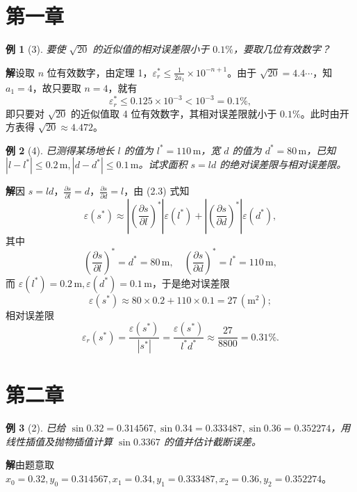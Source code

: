 \documentclass[a4paper,12pt]{ctexart}
\theoremstyle{exampleStyle}
\newtheorem*{example}{例}
\newcommand{\solution}{\par\noindent\textbf{解}\quad}
\begin{document}
\section*{第一章}

\begin{example}[3]
要使 $\sqrt{20}$ 的近似值的相对误差限小于 $0.1\%$，要取几位有效数字？
\end{example}

\solution 设取 $n$ 位有效数字，由定理 1，$\varepsilon_r^* \leqslant \frac{1}{2a_1} \times 10^{-n+1}$。由于 $\sqrt{20} = 4.4 \cdots$，知 $a_1=4$，故只要取 $n=4$，就有
\[
\varepsilon_r^* \leqslant 0.125 \times 10^{-3} < 10^{-3} = 0.1\%,
\]
即只要对 $\sqrt{20}$ 的近似值取 4 位有效数字，其相对误差限就小于 $0.1\%$。此时由开方表得 $\sqrt{20} \approx 4.472$。

\begin{example}[4]
已测得某场地长 $l$ 的值为 $l^* = 110\,\mathrm{m}$，宽 $d$ 的值为 $d^* = 80\,\mathrm{m}$，已知 $|l - l^*| \leqslant 0.2\,\mathrm{m}, |d - d^*| \leqslant 0.1\,\mathrm{m}$。试求面积 $s = ld$ 的绝对误差限与相对误差限。
\end{example}

\solution 因 $s=ld$，$\frac{\partial s}{\partial l} = d$，$\frac{\partial s}{\partial d} = l$，由 (2.3) 式知
\[
\varepsilon(s^*) \approx \left| \left( \frac{\partial s}{\partial l} \right)^* \right| \varepsilon(l^*) + \left| \left( \frac{\partial s}{\partial d} \right)^* \right| \varepsilon(d^*),
\]
其中
\[
\left( \frac{\partial s}{\partial l} \right)^* = d^* = 80\,\mathrm{m}, \quad \left( \frac{\partial s}{\partial d} \right)^* = l^* = 110\,\mathrm{m},
\]
而 $\varepsilon(l^*) = 0.2\,\mathrm{m}, \varepsilon(d^*) = 0.1\,\mathrm{m}$，于是绝对误差限
\[
\varepsilon(s^*) \approx 80 \times 0.2 + 110 \times 0.1 = 27\,(\mathrm{m}^2);
\]
相对误差限
\[
\varepsilon_r(s^*) = \frac{\varepsilon(s^*)}{|s^*|} = \frac{\varepsilon(s^*)}{l^* d^*} \approx \frac{27}{8800} = 0.31\%.
\]

\section*{第二章}

\begin{example}[2]
已给 $\sin 0.32 = 0.314567, \sin 0.34 = 0.333487, \sin 0.36 = 0.352274$，用线性插值及抛物插值计算 $\sin 0.3367$ 的值并估计截断误差。
\end{example}

\solution 由题意取 $x_0 = 0.32, y_0 = 0.314567, x_1 = 0.34, y_1 = 0.333487, x_2 = 0.36, y_2 = 0.352274$。
\end{document}
